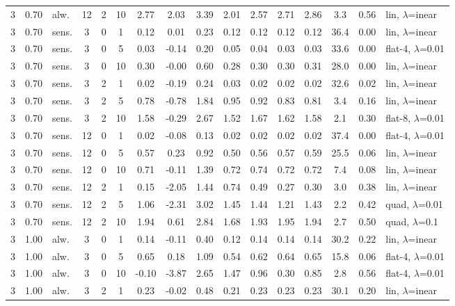 \begin{scriptsize}
\begin{longtable}{cclcc c ccc ccc c cc l}
3 & 0.70 & alw. & 12 & 2 & 10 & 2.77 & 2.03 & 3.39 & 2.01 & 2.57 & 2.71 & 2.86 & 3.3 & 0.56 & lin, $\lambda$=inear \\
3 & 0.70 & sens. & 3 & 0 & 1 & 0.12 & 0.01 & 0.23 & 0.12 & 0.12 & 0.12 & 0.12 & 36.4 & 0.00 & lin, $\lambda$=inear \\
3 & 0.70 & sens. & 3 & 0 & 5 & 0.03 & -0.14 & 0.20 & 0.05 & 0.04 & 0.03 & 0.03 & 33.6 & 0.00 & flat-4, $\lambda$=0.01 \\
3 & 0.70 & sens. & 3 & 0 & 10 & 0.30 & -0.00 & 0.60 & 0.28 & 0.30 & 0.30 & 0.31 & 28.0 & 0.00 & lin, $\lambda$=inear \\
3 & 0.70 & sens. & 3 & 2 & 1 & 0.02 & -0.19 & 0.24 & 0.03 & 0.02 & 0.02 & 0.02 & 32.6 & 0.02 & lin, $\lambda$=inear \\
3 & 0.70 & sens. & 3 & 2 & 5 & 0.78 & -0.78 & 1.84 & 0.95 & 0.92 & 0.83 & 0.81 & 3.4 & 0.16 & lin, $\lambda$=inear \\
3 & 0.70 & sens. & 3 & 2 & 10 & 1.58 & -0.29 & 2.67 & 1.52 & 1.67 & 1.62 & 1.58 & 2.1 & 0.30 & flat-8, $\lambda$=0.01 \\
3 & 0.70 & sens. & 12 & 0 & 1 & 0.02 & -0.08 & 0.13 & 0.02 & 0.02 & 0.02 & 0.02 & 37.4 & 0.00 & flat-4, $\lambda$=0.01 \\
3 & 0.70 & sens. & 12 & 0 & 5 & 0.57 & 0.23 & 0.92 & 0.50 & 0.56 & 0.57 & 0.59 & 25.5 & 0.06 & lin, $\lambda$=inear \\
3 & 0.70 & sens. & 12 & 0 & 10 & 0.71 & -0.11 & 1.39 & 0.72 & 0.74 & 0.72 & 0.72 & 7.4 & 0.08 & lin, $\lambda$=inear \\
3 & 0.70 & sens. & 12 & 2 & 1 & 0.15 & -2.05 & 1.44 & 0.74 & 0.49 & 0.27 & 0.30 & 3.0 & 0.38 & lin, $\lambda$=inear \\
3 & 0.70 & sens. & 12 & 2 & 5 & 1.06 & -2.31 & 3.02 & 1.45 & 1.44 & 1.21 & 1.43 & 2.2 & 0.42 & quad, $\lambda$=0.01 \\
3 & 0.70 & sens. & 12 & 2 & 10 & 1.94 & 0.61 & 2.84 & 1.68 & 1.93 & 1.95 & 1.94 & 2.7 & 0.50 & quad, $\lambda$=0.1 \\
3 & 1.00 & alw. & 3 & 0 & 1 & 0.14 & -0.11 & 0.40 & 0.12 & 0.14 & 0.14 & 0.14 & 30.2 & 0.22 & lin, $\lambda$=inear \\
3 & 1.00 & alw. & 3 & 0 & 5 & 0.65 & 0.18 & 1.09 & 0.54 & 0.62 & 0.64 & 0.65 & 15.8 & 0.06 & flat-4, $\lambda$=0.01 \\
3 & 1.00 & alw. & 3 & 0 & 10 & -0.10 & -3.87 & 2.65 & 1.47 & 0.96 & 0.30 & 0.85 & 2.8 & 0.56 & flat-4, $\lambda$=0.01 \\
3 & 1.00 & alw. & 3 & 2 & 1 & 0.23 & -0.02 & 0.48 & 0.21 & 0.23 & 0.23 & 0.23 & 30.1 & 0.20 & lin, $\lambda$=inear \\

\end{longtable}
\end{scriptsize}
